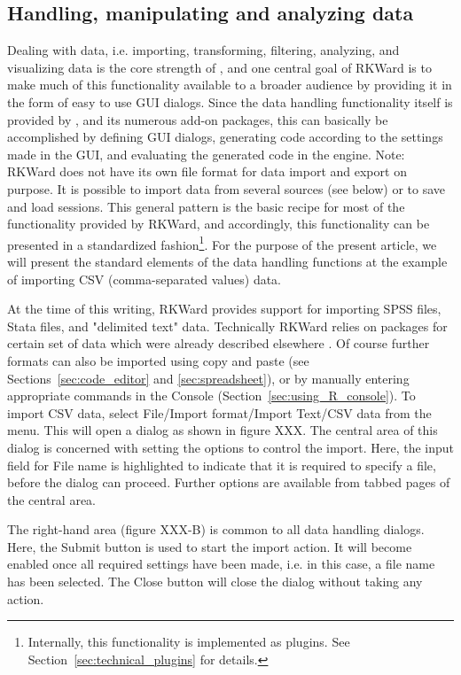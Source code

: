 \subsection{Handling, manipulating and analyzing data}
\label{sec:analyzing_data}

Dealing with data, i.e. importing, transforming, filtering, analyzing, and visualizing data is the core
strength of , and one central goal of
RKWard is to make much of this functionality available to a broader
audience by providing it in the form of easy to use GUI dialogs. Since
the data handling functionality itself is provided by
, and its numerous add-on packages, this
can basically be accomplished by defining GUI dialogs, generating
 code according to the settings made in
the GUI, and evaluating the generated code in the
 engine. Note: RKWard does not have its
own file format for data import and export on purpose. It is possible
to import data from several sources (see below) or to save and load
 sessions. This general pattern is the
basic recipe for most of the functionality provided by RKWard, and
accordingly, this functionality can be presented in a standardized
fashion\footnote{Internally, this functionality is implemented as
plugins. See Section~\ref{sec:technical_plugins} for details.}. For
the purpose of the present article, we will present the standard
elements of the data handling functions at the example of importing CSV
(comma-separated values) data.

At the time of this writing, RKWard provides support for importing SPSS
files, Stata files, and "delimited text" data. Technically RKWard
relies on  packages for certain set of
data which were already described elsewhere
\citep{Murdoch2002}. Of course further formats can
also be imported using copy and paste (see Sections~\ref{sec:code_editor} and \ref{sec:spreadsheet}), or by
manually entering appropriate  commands in
the  Console (Section~\ref{sec:using_R_console}). To import CSV
data, select File/Import format/Import Text/CSV
data from the menu. This will open a dialog as shown in
figure XXX. The central area of this dialog is concerned with setting
the options to control the import. Here, the input field for
File name is highlighted to indicate that
it is required to specify a file, before the dialog can proceed.
Further options are available from tabbed pages of the central area.

The right-hand area (figure XXX-B) is common to all data handling
dialogs. Here, the Submit button is used
to start the import action. It will become enabled once all required
settings have been made, i.e. in this case, a file name has been
selected. The Close button will close the
dialog without taking any action.

